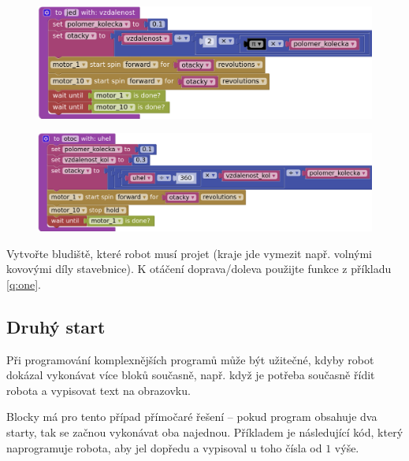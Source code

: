 \documentclass[../main.tex]{subfiles}
\begin{document}
	\begin{solution}
		\begin{figure}
			\centering
			\begin{minipage}{0.6\textwidth}
				\includegraphics[width=\linewidth]{Images/05/fjed.png}
			\end{minipage}
		\end{figure}

		\begin{figure}
			\centering
			\begin{minipage}{0.6\textwidth}
				\includegraphics[width=\linewidth]{Images/05/fotoc.png}
			\end{minipage}
		\end{figure}
	\end{solution}

	\begin{question*}
		Vytvořte bludiště, které robot musí projet (kraje jde vymezit např. volnými kovovými díly stavebnice). K otáčení doprava/doleva použijte funkce z příkladu \ref{q:one}.
	\end{question*}

	\subsection{Druhý start}
	Při programování komplexnějších programů může být užitečné, kdyby robot dokázal vykonávat více bloků současně, např. když je potřeba současně řídit robota a vypisovat text na obrazovku.

	Blocky má pro tento případ přímočaré řešení -- pokud program obsahuje dva starty, tak se začnou vykonávat oba najednou. Příkladem je následující kód, který naprogramuje robota, aby jel dopředu a vypisoval u toho čísla od $1$ výše.
\end{document}
